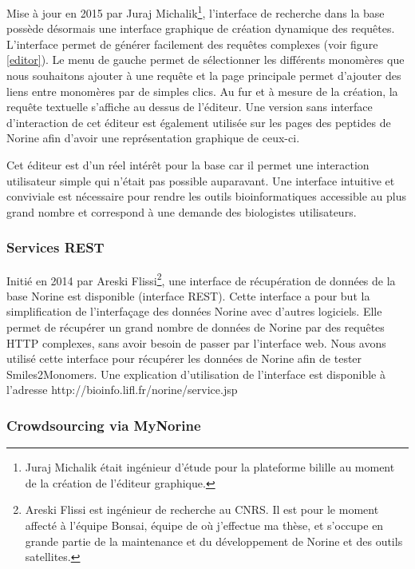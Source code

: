Mise à jour en 2015 par Juraj Michalik\footnote{Juraj Michalik était ingénieur d'étude pour la plateforme bilille au moment de la création de l'éditeur graphique.}, l'interface de recherche dans la base possède désormais une interface graphique de création dynamique des requêtes.
L'interface permet de générer facilement des requêtes complexes (voir figure \ref{editor}).
Le menu de gauche permet de sélectionner les différents monomères que nous souhaitons ajouter à une requête et la page principale permet d'ajouter des liens entre monomères par de simples clics.
Au fur et à mesure de la création, la requête textuelle s'affiche au dessus de l'éditeur.
Une version sans interface d'interaction de cet éditeur est également utilisée sur les pages des peptides de Norine afin d'avoir une représentation graphique de ceux-ci.

Cet éditeur est d'un réel intérêt pour la base car il permet une interaction utilisateur simple qui n'était pas possible auparavant.
Une interface intuitive et conviviale est nécessaire pour rendre les outils bioinformatiques accessible au plus grand nombre et correspond à une demande des biologistes utilisateurs.



\subsubsection{Services REST}

Initié en 2014 par Areski Flissi\footnote{Areski Flissi est ingénieur de recherche au CNRS. Il est pour le moment affecté à l'équipe Bonsai, équipe de où j'effectue ma thèse, et s'occupe en grande partie de la maintenance et du développement de Norine et des outils satellites.}, une interface de récupération de données de la base Norine est disponible (interface REST).
Cette interface a pour but la simplification de l'interfaçage des données Norine avec d'autres logiciels.
Elle permet de récupérer un grand nombre de données de Norine par des requêtes HTTP complexes, sans avoir besoin de passer par l'interface web.
Nous avons utilisé cette interface pour récupérer les données de Norine afin de tester Smiles2Monomers.
Une explication d'utilisation de l'interface est disponible à l'adresse http://bioinfo.lifl.fr/norine/service.jsp



\subsubsection{Crowdsourcing via MyNorine}


